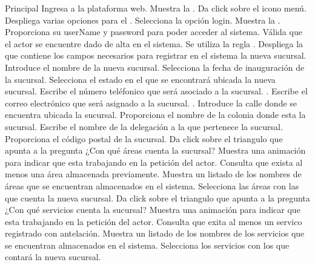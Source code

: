 	\begin{UCtrayectoria}{Principal}
		\UCpaso[\UCactor] Ingresa a la plataforma web. 
		\UCpaso Muestra la .
		\UCpaso[\UCactor] Da click sobre el icono menú.
		\UCpaso Despliega varias opciones para el \UCactor.
		\UCpaso[\UCactor] Selecciona la opción login.
		\UCpaso Muestra la  \label{CU11Login}.
		\UCpaso[\UCactor] Proporciona su userName y password para poder acceder al sistema.
		\UCpaso Válida que el actor se encuentre dado de alta en el sistema. Se utiliza la regla  . %
		\UCpaso Despliega la  que contiene los campos necesarios para registrar en el sistema la nueva sucursal.
		\UCpaso[\UCactor] Introduce el nombre de la nueva sucursal.
		\UCpaso[\UCactor] Selecciona la fecha de inauguración de la sucursal.
		\UCpaso[\UCactor] Selecciona el estado en el que se encontrará ubicada la nueva sucursal.
		\UCpaso[\UCactor] Escribe el número teléfonico que será asociado a la sucursal. \label{CU11AgregarTelefono}.
		\UCpaso[\UCactor] Escribe el correo electrónico que será asignado a la sucursal. \label{CU11AgregarMail}.
		\UCpaso[\UCactor] Introduce la calle donde se encuentra ubicada la sucursal.
		\UCpaso[\UCactor] Proporciona el nombre de la colonia donde esta la sucursal.
		\UCpaso[\UCactor] Escribe el nombre de la delegación a la que pertenece la sucursal.
		\UCpaso[\UCactor] Proporciona el código postal de la sucursal.
		\UCpaso[\UCactor] Da click sobre el triangulo que apunta a la pregunta ¿Con qué áreas cuenta la sucursal?
		\UCpaso Muestra una animación para indicar que esta trabajando en la petición del actor.
		\UCpaso Consulta que exista al menos una área almacenada previamente. \label{CU11ProblemAreas}
		\UCpaso	Muestra un listado de los nombres de áreas que se encuentran almacenados en el sistema.
		\UCpaso[\UCactor] Selecciona las áreas con las que cuenta la nueva sucursal.
		\UCpaso[\UCactor] Da click sobre el triangulo que apunta a la pregunta ¿Con qué servicios cuenta la sucursal?
		\UCpaso Muestra una animación para indicar que esta trabajando en la petición del actor.
		\UCpaso Consulta que exita al menos un servico registrado con antelación. \label{CU11ProblemServicios}
		\UCpaso	Muestra un listado de los nombres de los servicios que se encuentran almacenados en el sistema.
		\UCpaso[\UCactor] Selecciona los servicios con los que contará la nueva sucursal.		

\end{UCtrayectoria}
